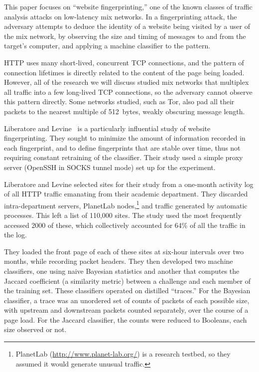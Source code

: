 \documentclass{cmuecequal}
\begin{document}
This paper focuses on “website fingerprinting,” one of the known
classes of traffic analysis attacks on low-latency mix networks.  In a
fingerprinting attack, the adversary attempts to deduce the identity
of a website being visited by a user of the mix network, by observing
the size and timing of messages to and from the target's computer, and
applying a machine classifier to the pattern.

HTTP uses many short-lived, concurrent TCP connections, and the
pattern of connection lifetimes is directly related to the content of
the page being loaded.  However, all of the research we will discuss
studied mix networks that multiplex all traffic into a few long-lived
TCP connections, so the adversary cannot observe this pattern
directly.  Some networks studied, such as Tor, also pad all their
packets to the nearest multiple of 512~bytes, weakly obscuring message
length.

Liberatore and Levine~\cite{Liberatore:2006} is a particularly
influential study of website fingerprinting. They sought to minimize
the amount of information recorded in each fingerprint, and to define
fingerprints that are stable over time, thus not requiring constant
retraining of the classifier.  Their study used a simple proxy server
(OpenSSH in SOCKS tunnel mode) set up for the experiment.

Liberatore and Levine selected sites for their study from a one-month
activity log of all HTTP traffic emanating from their academic
department.  They discarded intra-department servers, PlanetLab
nodes,\footnote{PlanetLab (\url{http://www.planet-lab.org/}) is a
  research testbed, so they assumed it would generate unusual
  traffic.} and traffic generated by automatic processes. This left a
list of 110,000 sites.  The study used the most frequently accessed
2000 of these, which collectively accounted for 64\% of all the
traffic in the log.

They loaded the front page of each of these sites at six-hour
intervals over two months, while recording packet headers.  They then
developed two machine classifiers, one using naive Bayesian statistics
and another that computes the Jaccard coefficient (a similarity
metric) between a challenge and each member of the training set.
These classifiers operated on distilled “traces.”  For the Bayesian
classifier, a trace was an unordered set of counts of packets of each
possible size, with upstream and downstream packets counted
separately, over the course of a page load.  For the Jaccard
classifier, the counts were reduced to Booleans, each size observed or
not.
\end{document}
